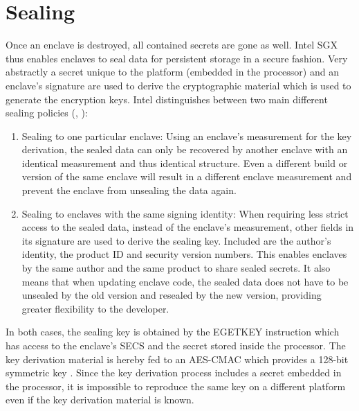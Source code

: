\section{Sealing}
Once an enclave is destroyed, all contained secrets are gone as well. Intel SGX thus enables enclaves to seal data for persistent storage in a secure fashion. Very abstractly a
secret unique to the platform (embedded in the processor) and an enclave's signature are used to derive the cryptographic material which is used to generate the encryption keys. 
Intel distinguishes between two main different sealing policies (\cite{EnclaveWritersGuide}, \cite{IntelSealing}):
\begin{enumerate}
    \item Sealing to one particular enclave: Using an enclave's measurement for the key derivation, the sealed data can only be recovered by another enclave with an identical
          measurement and thus identical structure. Even a different build or version of the same enclave will result in a different enclave measurement and prevent the enclave
          from unsealing the data again.
    \item Sealing to enclaves with the same signing identity: When requiring less strict access to the sealed data, instead of the enclave's measurement, other fields in its
          signature are used to derive the sealing key. Included are the author's identity, the product ID and security version numbers. This enables enclaves by the same
          author and the same product to share sealed secrets. It also means that when updating enclave code, the sealed data does not have to be unsealed by the old version
          and resealed by the new version, providing greater flexibility to the developer.
\end{enumerate}
In both cases, the sealing key is obtained by the EGETKEY instruction which has access to the enclave's SECS and the secret stored inside the processor. The key derivation material
is hereby fed to an AES-CMAC which provides a 128-bit symmetric key \cite{Costan2016IntelSE}. Since the key derivation process includes a secret embedded in the processor, it is
impossible to reproduce the same key on a different platform even if the key derivation material is known.